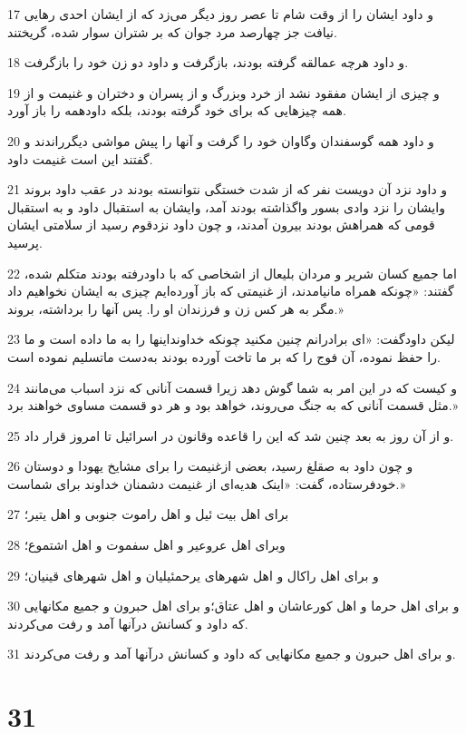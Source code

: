 \par 17 و داود ایشان را از وقت شام تا عصر روز دیگر می‌زد که از ایشان احدی رهایی نیافت جز چهارصد مرد جوان که بر شتران سوار شده، گریختند.
\par 18 و داود هرچه عمالقه گرفته بودند، بازگرفت و داود دو زن خود را بازگرفت.
\par 19 و چیزی از ایشان مفقود نشد از خرد وبزرگ و از پسران و دختران و غنیمت و از همه چیزهایی که برای خود گرفته بودند، بلکه داودهمه را باز آورد.
\par 20 و داود همه گوسفندان وگاوان خود را گرفت و آنها را پیش مواشی دیگرراندند و گفتند این است غنیمت داود.
\par 21 و داود نزد آن دویست نفر که از شدت خستگی نتوانسته بودند در عقب داود بروند وایشان را نزد وادی بسور واگذاشته بودند آمد، وایشان به استقبال داود و به استقبال قومی که همراهش بودند بیرون آمدند، و چون داود نزدقوم رسید از سلامتی ایشان پرسید.
\par 22 اما جمیع کسان شریر و مردان بلیعال از اشخاصی که با داودرفته بودند متکلم شده، گفتند: «چونکه همراه مانیامدند، از غنیمتی که باز آورده‌ایم چیزی به ایشان نخواهیم داد مگر به هر کس زن و فرزندان او را. پس آنها را برداشته، بروند.»
\par 23 لیکن داودگفت: «ای برادرانم چنین مکنید چونکه خداونداینها را به ما داده است و ما را حفظ نموده، آن فوج را که بر ما تاخت آورده بودند به‌دست ماتسلیم نموده است.
\par 24 و کیست که در این امر به شما گوش دهد زیرا قسمت آنانی که نزد اسباب می‌مانند مثل قسمت آنانی که به جنگ می‌روند، خواهد بود و هر دو قسمت مساوی خواهند برد.»
\par 25 و از آن روز به بعد چنین شد که این را قاعده وقانون در اسرائیل تا امروز قرار داد.
\par 26 و چون داود به صقلغ رسید، بعضی ازغنیمت را برای مشایخ یهودا و دوستان خودفرستاده، گفت: «اینک هدیه‌ای از غنیمت دشمنان خداوند برای شماست.»
\par 27 برای اهل بیت ئیل و اهل راموت جنوبی و اهل یتیر؛
\par 28 وبرای اهل عروعیر و اهل سفموت و اهل اشتموع؛
\par 29 و برای اهل راکال و اهل شهرهای یرحمئیلیان و اهل شهرهای قینیان؛
\par 30 و برای اهل حرما و اهل کورعاشان و اهل عتاق؛و برای اهل حبرون و جمیع مکانهایی که داود و کسانش درآنها آمد و رفت می‌کردند.
\par 31 و برای اهل حبرون و جمیع مکانهایی که داود و کسانش درآنها آمد و رفت می‌کردند.
 
\chapter{31}

